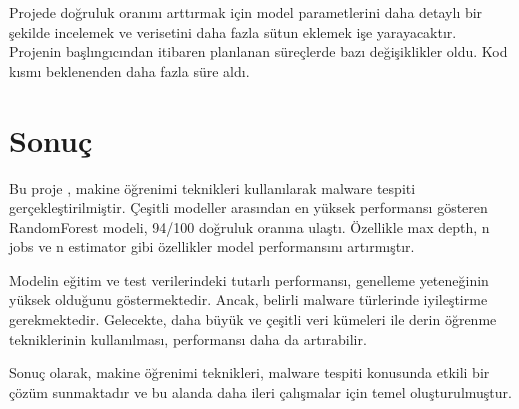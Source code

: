 \documentclass{article}
\begin{document}
Projede doğruluk oranını arttırmak için model parametlerini daha detaylı bir şekilde incelemek ve verisetini daha fazla sütun eklemek işe yarayacaktır.\\

Projenin başlıngıcından itibaren planlanan süreçlerde bazı değişiklikler oldu. Kod kısmı beklenenden daha fazla süre aldı.

\section{Sonuç}
Bu proje , makine öğrenimi teknikleri kullanılarak malware tespiti  gerçekleştirilmiştir. Çeşitli modeller arasından en yüksek performansı gösteren RandomForest modeli, 94/100 doğruluk oranına ulaştı. Özellikle max depth, n jobs ve n estimator gibi özellikler model performansını artırmıştır.

Modelin eğitim ve test verilerindeki tutarlı performansı, genelleme yeteneğinin yüksek olduğunu göstermektedir. Ancak, belirli malware türlerinde iyileştirme gerekmektedir. Gelecekte, daha büyük ve çeşitli veri kümeleri ile derin öğrenme tekniklerinin kullanılması, performansı daha da artırabilir.

Sonuç olarak, makine öğrenimi teknikleri, malware tespiti konusunda etkili bir çözüm sunmaktadır ve bu alanda daha ileri çalışmalar için temel oluşturulmuştur.

\printbibliography
\end{document}
